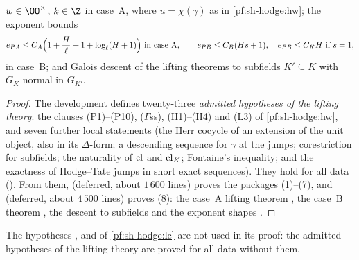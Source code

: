 \begin{theorem}
\begin{enumerate}[label=(\arabic*)]
  $w\in\OO^\times$, $k\in\Z$ in case~A, where $u=\chi(\gamma)$ as in \cref{pf:sh-hodge:hw}; the exponent bounds
  \[
  e_{PA}\le C_A\Bigl(1+\frac{H}{\ell}+1+\log_\ell(H+1)\Bigr)\ \text{in case~A},\qquad e_{PB}\le C_B(Hs+1),\quad e_{PB}\le C_KH\ \text{if }s=1,
  \]
  in case~B; and Galois descent of the lifting theorems to subfields $K'\subseteq K$ with $G_K$ normal in $G_{K'}$.
\end{enumerate}
\end{theorem}

\begin{proof}
The development defines twenty-three \emph{admitted hypotheses of the lifting theory}: the clauses (P1)--(P10), ($\Gamma$ss), (H1)--(H4) and (L3)
of \cref{pf:sh-hodge:hw}, and seven further local statements (the Herr cocycle of an extension of the unit object, also in its $\Delta$-form; a
descending sequence for $\gamma$ at the jumps; corestriction for subfields; the naturality of $\operatorname{cl}$ and $\operatorname{cl}_K$; Fontaine's
inequality; and the exactness of Hodge--Tate jumps in short exact sequences). They hold for all data
(). From them, 
(deferred, about $1\,600$ lines) proves the packages (1)--(7), and 
(deferred, about $4\,500$ lines) proves (8): the case~A lifting theorem , the
case~B theorem , the descent to subfields
 and the exponent shapes
.
\end{proof}

\begin{remark}
The hypotheses \shhodgeBK, \shhodgeLTD{} and \shhodgeLEC{} of \cref{pf:sh-hodge:lc} are not used in its proof: the admitted hypotheses of the
lifting theory are proved for all data without them.
\end{remark}

